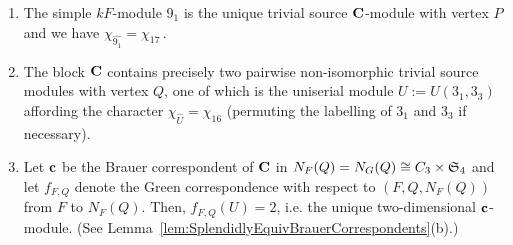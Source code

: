 \begin{lem}\label{lem:tsmodulesA}\leavevmode
\begin{enumerate}[label={\rm(\alph*)}]
    \item The simple $kF$-module $9_1$ is the unique trivial source ${\mathbf{C}}$-module with vertex $P$ and we have $\chi^{}_{\widehat{9_1}}=\chi^{}_{17}$\,.
    \item The block ${\mathbf{C}}$ contains precisely two pairwise non-isomorphic trivial source modules with vertex $Q$, one of which is the uniserial module $U:=U(3_1,3_3)$ affording the character $\chi^{}_{\widehat{U}}=\chi^{}_{16}$ (permuting the labelling of $3_1$ and $3_3$ if necessary).
    \item Let ${\mathbf{c}}$ be the Brauer correspondent of ${\mathbf{C}}$ in $N_F(Q)=N_G(Q)\cong C_3\times {\mathfrak{S}}_4$ and let $f_{F,Q}$ denote the Green correspondence with respect to $(F,Q,N_F(Q))$ from $F$ to $N_F(Q)$.  Then, $f_{F,Q}(U)=2$, i.e. the unique two-dimensional ${\mathbf{c}}$-module. (See Lemma~\ref{lem:SplendidlyEquivBrauerCorrespondents}(b).)
\end{enumerate} 
\end{lem}


